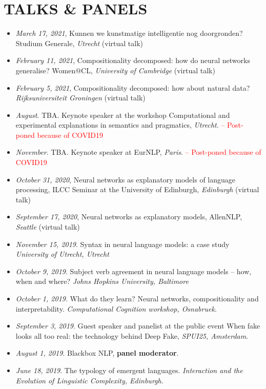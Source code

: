 \section{TALKS \& PANELS}

\begin{itemize}
    \setlength\itemsep{5pt}
    \item \textit{March 17, 2021}, Kunnen we kunstmatige intelligentie nog doorgronden? Studium Generale, \textit{Utrecht} (virtual talk)
    \item \textit{February 11, 2021}, Compositionality decomposed: how do neural networks generalise? Women@CL, \textit{University of Cambridge} (virtual talk)
    \item \textit{February 5, 2021}, Compositionality decomposed: how about natural data? \textit{Rijksuniversiteit Groningen} (virtual talk)
        \item \textit{August}. TBA. Keynote speaker at the workshop Computational and experimental explanations in semantics and pragmatics, \textit{Utrecht}. \textcolor{red}{ -- Post-poned because of COVID19}
        \item \textit{November}. TBA. Keynote speaker at EurNLP, \textit{Paris}. \textcolor{red}{ -- Post-poned because of COVID19}
    \item \textit{October 31, 2020}, Neural networks as explanatory models of language processing, ILCC Seminar at the University of Edinburgh, \textit{Edinburgh} (virtual talk)
    \item \textit{September 17, 2020}, Neural networks as explanatory models, AllenNLP, \textit{Seattle} (virtual talk)
    \item \textit{November 15, 2019}. Syntax in neural language models: a case study \textit{University of Utrecht, Utrecht}
    \item \textit{October 9, 2019}. Subject verb agreement in neural language models -- how, when and where? \textit{Johns Hopkins University, Baltimore}
    \item \textit{October 1, 2019}. What do they learn? Neural networks, compositionality and interpretability. \textit{Computational Cognition workshop, Osnabruek}.
    \item \textit{September 3, 2019}. Guest speaker and panelist at the public event When fake looks all too real: the technology behind Deep Fake, \textit{SPUI25, Amsterdam}.
    \item \textit{August 1, 2019}. Blackbox NLP, \textbf{panel moderator}.
    \item \textit{June 18, 2019}. The typology of emergent languages. \textit{Interaction and the Evolution of Linguistic Complexity, Edinburgh}.

\end{itemize}
